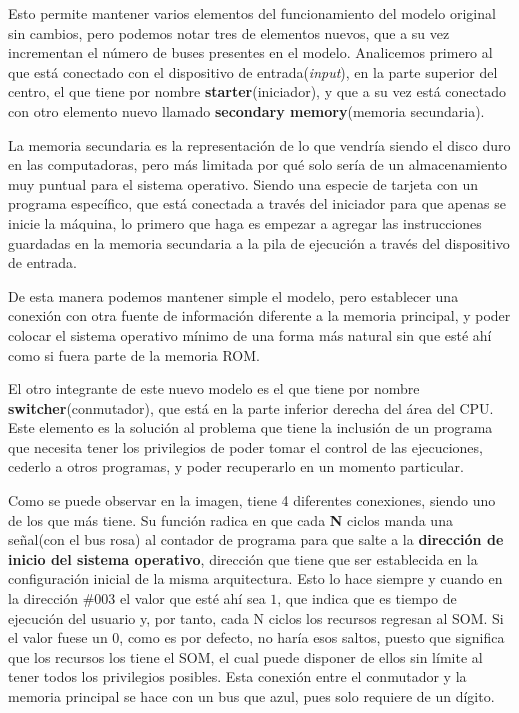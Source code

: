 \documentclass[letterpaper,12pt,oneside]{book}
\begin{document}
		
		Esto permite mantener varios elementos del funcionamiento del modelo original sin cambios, pero podemos notar tres de elementos nuevos, que a su vez
		incrementan el número de buses presentes en el modelo. Analicemos primero al que está conectado con el dispositivo de entrada(\textit{input}), en la parte superior del centro,
		el que tiene por nombre \textbf{starter}(iniciador), y que a su vez está conectado con otro elemento nuevo llamado \textbf{secondary memory}(memoria secundaria).

  
		La memoria secundaria es la representación de lo que vendría siendo el disco duro en las computadoras, pero más limitada por qué solo sería de un almacenamiento
		muy puntual para el sistema operativo. Siendo una especie de tarjeta con un programa específico, que
		está conectada a través del iniciador para que apenas se inicie la máquina, lo primero que haga es empezar a agregar las instrucciones guardadas
		en la memoria secundaria a la pila de ejecución a través del dispositivo de entrada.
  
        De esta manera podemos mantener simple el modelo, pero establecer una conexión
		con otra fuente de información diferente a la memoria principal, y poder colocar el sistema operativo mínimo de una forma más natural sin que esté ahí como si fuera parte de la memoria ROM.
		
		
		El otro integrante de este nuevo modelo es el que tiene por nombre \textbf{switcher}(conmutador), que está en la parte inferior derecha del área del CPU.
		Este elemento es la solución al problema que tiene la inclusión de un programa que necesita tener los privilegios de poder tomar el control de las ejecuciones,
		cederlo a otros programas, y poder recuperarlo en un momento particular.
  
        Como se puede observar en la imagen, tiene 4 diferentes conexiones, siendo uno
		de los que más tiene. Su función radica en que cada \textbf{N} ciclos manda una señal(con el bus rosa) al contador de programa para que salte a la \textbf{dirección 
		de inicio del sistema operativo}, dirección que tiene que ser establecida en la configuración inicial de la misma arquitectura. Esto lo hace siempre y cuando en la dirección
		\#003 el valor que esté ahí sea $1$, que indica que es tiempo de ejecución del usuario y, por tanto, cada N ciclos los recursos regresan al SOM. Si
		el valor fuese un $0$, como es por defecto, no haría esos saltos, puesto que significa que los recursos los tiene el SOM, el cual puede disponer
		de ellos sin límite al tener todos los privilegios posibles. Esta conexión entre el conmutador y la memoria principal se hace con un bus que azul, pues solo requiere de un dígito.
  
\end{document}
